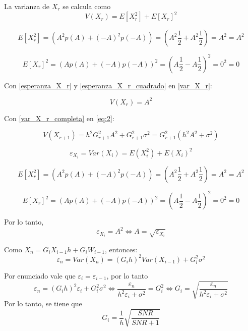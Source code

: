 \documentclass{article}
\begin{document}
La varianza de $X_r$ se calcula como
\begin{equation}\label{var_X_r}
    V(X_r)=E[X_r^2]+E[X_r]^2
\end{equation}

\begin{equation}\label{esperanza_X_r_cuadrado}
    E[X_r^2]=(A^2 p(A)+(-A)^2p(-A))=(A^2\frac{1}{2}+A^2\frac{1}{2})=A^2=A^2
\end{equation}

\begin{equation}\label{esperanza_X_r}
    E[X_r]^2=(Ap(A)+(-A)p(-A))^2=(A\frac{1}{2}-A\frac{1}{2})^2=0^2=0
\end{equation}

Con \ref{esperanza_X_r} y \ref{esperanza_X_r_cuadrado} en \ref{var_X_r}:

\begin{equation}\label{var_X_r_completa}
    V(X_r)=A^2
\end{equation}

Con \ref{var_X_r_completa} en \ref{eq:2}:

\begin{equation}
    V(X_{r+1})=h^2 G_{r+1}^2 A^2 + G_{r+1} ^2 \sigma ^2 = G_{r+1}^2(h^2 A^2 + \sigma ^2)
\end{equation}
\fi

\begin{equation}
    \varepsilon_{X_i}=Var(X_i)=E(X_i^2)+E(X_i)^2
\end{equation}

\begin{equation}\label{esperanza_X_r_cuadrado}
    E[X_r^2]=(A^2 p(A)+(-A)^2p(-A))=(A^2\frac{1}{2}+A^2\frac{1}{2})=A^2=A^2
\end{equation}

\begin{equation}\label{esperanza_X_r}
    E[X_r]^2=(Ap(A)+(-A)p(-A))^2=(A\frac{1}{2}-A\frac{1}{2})^2=0^2=0
\end{equation}

Por lo tanto, 
\begin{equation}
    \varepsilon_{X_i}=A^2 \Leftrightarrow A=\sqrt{\varepsilon_{X_i}}
\end{equation}

Como $X_n = G_i X_{i-1} h + G_i W_{i-1}$, entonces:
\begin{equation}
    \varepsilon_n=Var(X_n)=(G_i h)^2 Var(X_{i-1})+G_i^2 \sigma ^2
\end{equation}

Por enunciado vale que $\varepsilon_i = \varepsilon_{i-1}$, por lo tanto
\begin{equation}
    \varepsilon_n = (G_i h)^2 \varepsilon_i + G_i^2 \sigma ^2 \Leftrightarrow \frac{\varepsilon_n}{h^2 \varepsilon_i + \sigma ^2}=G_i^2 \Leftrightarrow G_i=\sqrt{\frac{\varepsilon_n}{h^2 \varepsilon_i + \sigma ^2}}
\end{equation}
Por lo tanto, se tiene que 
\begin{equation}
    G_i=\frac{1}{h}\sqrt{\frac{SNR}{SNR+1}}
\end{equation}
\end{document}
